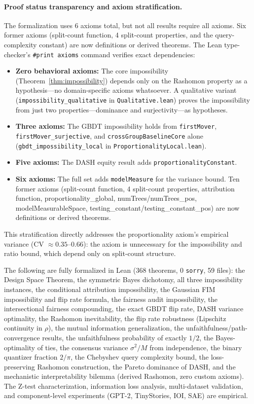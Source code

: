 \documentclass{jmlr}
\begin{document}
\paragraph{Proof status transparency and axiom stratification.}
The formalization uses 6 axioms total, but not all results require all axioms. Six former axioms (split-count function, 4 split-count properties, and the query-complexity constant) are now definitions or derived theorems. The Lean type-checker's \texttt{\#print axioms} command verifies exact dependencies:
\begin{itemize}
\item \textbf{Zero behavioral axioms:} The core impossibility (Theorem~\ref{thm:impossibility}) depends only on the Rashomon property as a hypothesis---no domain-specific axioms whatsoever. A qualitative variant (\texttt{impossibility\_qualitative} in \texttt{Qualitative.lean}) proves the impossibility from just two properties---dominance and surjectivity---as hypotheses.
\item \textbf{Three axioms:} The GBDT impossibility holds from \texttt{firstMover}, \texttt{firstMover\_surjective}, and \texttt{crossGroupBaselineCore} alone (\texttt{gbdt\_impossibility\_local} in \texttt{ProportionalityLocal.lean}).
\item \textbf{Five axioms:} The DASH equity result adds \texttt{proportionalityConstant}.
\item \textbf{Six axioms:} The full set adds \texttt{modelMeasure} for the variance bound. Ten former axioms (split-count function, 4 split-count properties, attribution function, proportionality\_global, numTrees/numTrees\_pos, modelMeasurableSpace, testing\_constant/testing\_constant\_pos) are now definitions or derived theorems.
\end{itemize}
This stratification directly addresses the proportionality axiom's empirical variance (CV $\approx 0.35$--$0.66$): the axiom is unnecessary for the impossibility and ratio bound, which depend only on split-count structure.

The following are fully formalized in Lean (368 theorems, 0 \texttt{sorry}, 59 files): the Design Space Theorem, the symmetric Bayes dichotomy, all three impossibility instances, the conditional attribution impossibility, the Gaussian FIM impossibility and flip rate formula, the fairness audit impossibility, the intersectional fairness compounding, the exact GBDT flip rate, DASH variance optimality, the Rashomon inevitability, the flip rate robustness (Lipschitz continuity in $\rho$), the mutual information generalization, the unfaithfulness/path-convergence results, the unfaithfulness probability of exactly $1/2$, the Bayes-optimality of ties, the consensus variance $\sigma^2/M$ from independence, the binary quantizer fraction $2/\pi$, the Chebyshev query complexity bound, the loss-preserving Rashomon construction, the Pareto dominance of DASH, and the mechanistic interpretability bilemma (derived Rashomon, zero custom axioms). The Z-test characterization, information loss analysis, multi-dataset validation, and component-level experiments (GPT-2, TinyStories, IOI, SAE) are empirical.
\end{document}
